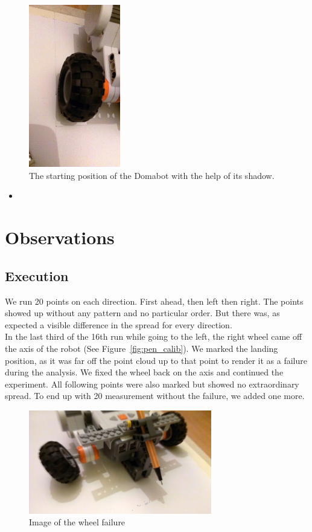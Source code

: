 \documentclass{scrartcl}
\begin{document}
\begin{figure}
 \center
 \includegraphics[width= 4cm]{img/wheel_adjust.jpg}
 \caption{The starting position of the Domabot with the help of its shadow.}
 \label{fig:setup}
\end{figure}

\begin{itemize}
\item
\end{itemize}


\section{Observations}
\subsection{Execution}

We run 20 points on each direction. First ahead, then left then right. The points showed up without any pattern and no particular order. But there was, as expected a visible difference in the spread for every direction.\\
In the last third of the 16th run while going to the left, the right wheel came off the axis of the robot (See Figure~\ref{fig:pen_calib}).
We marked the landing position, as it was far off the point cloud up to that point to render it as a failure during the analysis. We fixed the wheel back on the axis and continued the experiment. All following points were also marked but showed no extraordinary spread. To end up with 20 measurement without the failure, we added one more.

\begin{figure}
 \center
 \includegraphics[width= 8cm]{img/wheel_failure.jpg}
 \caption{Image of the wheel failure}
 \label{fig:failure}
\end{figure}
\end{document}
